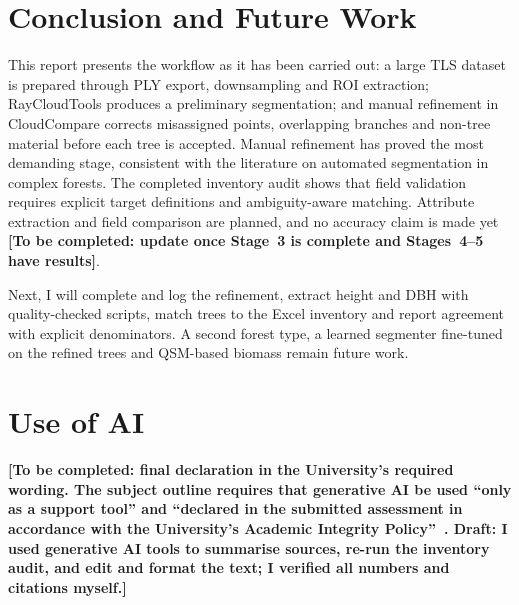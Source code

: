 \documentclass[runningheads]{llncs}
\newcommand{\todo}[1]{\textbf{[To be completed: #1]}}
\begin{document}
\section{Conclusion and Future Work}\label{sec:conclusion}
This report presents the workflow as it has been carried out: a large TLS dataset is prepared through PLY export, downsampling and ROI extraction; RayCloudTools produces a preliminary segmentation; and manual refinement in CloudCompare corrects misassigned points, overlapping branches and non-tree material before each tree is accepted. Manual refinement has proved the most demanding stage, consistent with the literature on automated segmentation in complex forests. The completed inventory audit shows that field validation requires explicit target definitions and ambiguity-aware matching. Attribute extraction and field comparison are planned, and no accuracy claim is made yet \todo{update once Stage~3 is complete and Stages~4--5 have results}.

Next, I will complete and log the refinement, extract height and DBH with quality-checked scripts, match trees to the Excel inventory and report agreement with explicit denominators. A second forest type, a learned segmenter fine-tuned on the refined trees and QSM-based biomass remain future work.

\section*{Use of AI}
\todo{final declaration in the University's required wording. The subject outline requires that generative AI be used ``only as a support tool'' and ``declared in the submitted assessment in accordance with the University's Academic Integrity Policy''~\cite{info6003}. Draft: I used generative AI tools to summarise sources, re-run the inventory audit, and edit and format the text; I verified all numbers and citations myself.}
\end{document}
